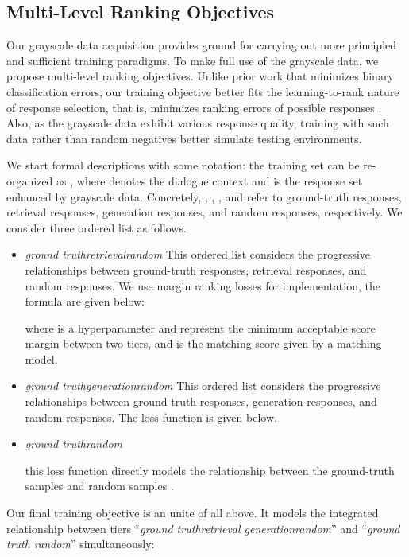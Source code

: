 \documentclass[11pt,a4paper]{article}
\begin{document}
	\subsection{Multi-Level Ranking Objectives}
	\label{sec:objective}
	Our grayscale data acquisition provides ground for carrying out more principled and sufficient training paradigms. To make full use of the grayscale data, we propose multi-level ranking objectives. Unlike prior work that minimizes binary classification errors, our training objective better fits the learning-to-rank nature of response selection, that is, minimizes ranking errors of possible responses \cite{cao2007learning}. Also, as the grayscale data exhibit various response quality, training with such data rather than random negatives better simulate testing environments.
	
	We start formal descriptions with some notation: the training set can be re-organized as , where  denotes the dialogue context and  is the response set enhanced by grayscale data. Concretely, , , , and  refer to ground-truth responses, retrieval responses, generation responses, and random responses, respectively. We consider three ordered list as follows.
	\begin{itemize}
		\item{\textit{ground truthretrievalrandom}} This ordered list considers the progressive relationships between ground-truth responses, retrieval responses, and random responses. We use margin ranking losses for implementation, the formula are given below:
		
		where  is a hyperparameter and represent the minimum acceptable score margin between two tiers, and  is the matching score given by a matching model.
		
		\item{\textit{ground truthgenerationrandom}} This ordered list considers the progressive relationships between ground-truth responses, generation responses, and random responses. The loss function is given below.
		
		
		\item{\textit{ground truthrandom}}
		
		this loss function directly models the relationship between the ground-truth samples  and random samples .
	\end{itemize}
	
	Our final training objective is an unite of all above. It models the integrated relationship between tiers ``\textit{ground truthretrieval  generationrandom}'' and ``\textit{ground truth  random}'' simultaneously:
	
\end{document}
